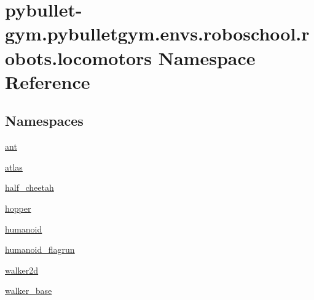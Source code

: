 \hypertarget{namespacepybullet-gym_1_1pybulletgym_1_1envs_1_1roboschool_1_1robots_1_1locomotors}{}\section{pybullet-\/gym.pybulletgym.\+envs.\+roboschool.\+robots.\+locomotors Namespace Reference}
\label{namespacepybullet-gym_1_1pybulletgym_1_1envs_1_1roboschool_1_1robots_1_1locomotors}
\subsection*{Namespaces}
\begin{DoxyCompactItemize}
\item 
 \hyperlink{namespacepybullet-gym_1_1pybulletgym_1_1envs_1_1roboschool_1_1robots_1_1locomotors_1_1ant}{ant}
\item 
 \hyperlink{namespacepybullet-gym_1_1pybulletgym_1_1envs_1_1roboschool_1_1robots_1_1locomotors_1_1atlas}{atlas}
\item 
 \hyperlink{namespacepybullet-gym_1_1pybulletgym_1_1envs_1_1roboschool_1_1robots_1_1locomotors_1_1half__cheetah}{half\+\_\+cheetah}
\item 
 \hyperlink{namespacepybullet-gym_1_1pybulletgym_1_1envs_1_1roboschool_1_1robots_1_1locomotors_1_1hopper}{hopper}
\item 
 \hyperlink{namespacepybullet-gym_1_1pybulletgym_1_1envs_1_1roboschool_1_1robots_1_1locomotors_1_1humanoid}{humanoid}
\item 
 \hyperlink{namespacepybullet-gym_1_1pybulletgym_1_1envs_1_1roboschool_1_1robots_1_1locomotors_1_1humanoid__flagrun}{humanoid\+\_\+flagrun}
\item 
 \hyperlink{namespacepybullet-gym_1_1pybulletgym_1_1envs_1_1roboschool_1_1robots_1_1locomotors_1_1walker2d}{walker2d}
\item 
 \hyperlink{namespacepybullet-gym_1_1pybulletgym_1_1envs_1_1roboschool_1_1robots_1_1locomotors_1_1walker__base}{walker\+\_\+base}
\end{DoxyCompactItemize}
